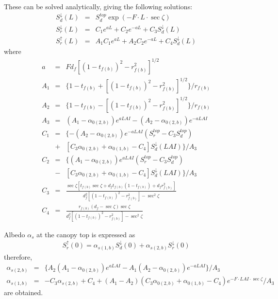 These can be solved analytically, giving the following solutions: \begin{eqnarray}
 S^{\downarrow}_d(L) &=& S^{top}_d \exp(-F\cdot L\cdot \sec\zeta) \\
 S^{\downarrow}_r(L) &=& C_1 e^{a L} + C_2 e^{-a L} + C_3 S^{\downarrow}_d(L) \\
 S^{\uparrow}_r(L)   &=& A_1 C_1 e^{a L} + A_2 C_2 e^{-a L} + C_4 S^{\downarrow}_d(L)
\end{eqnarray} where \begin{eqnarray}
   a &=& F d_f [(1-t_{f(b)})^2 - r_{f(b)}^2]^{1/2}  \\
 A_1 &=& \{ 1 - t_{f(b)} + [(1-t_{f(b)})^2 - r_{f(b)}^2]^{1/2}\} / r_{f(b)} \label{eq17} \\
 A_2 &=& \{ 1 - t_{f(b)} - [(1-t_{f(b)})^2 - r_{f(b)}^2]^{1/2}\} / r_{f(b)} \\
 A_3 &=& (A_1 - \alpha_{0(2,b)}) e^{ a LAI }
        -(A_2 - \alpha_{0(2,b)}) e^{-a LAI } \\
 C_1 &=& \{ -(A_2 - \alpha_{0(2,b)}) e^{-a LAI} (S^{top}_r - C_3 S^{top}_d) \nonumber\\
          &+&   [C_3\alpha_{0(2,b)}+\alpha_{0(1,b)}-C_4]S^{\downarrow}_d(LAI)\} / A_3 \\
 C_2 &=& \{  (A_1 - \alpha_{0(2,b)}) e^{ a LAI} (S^{top}_r - C_3 S^{top}_d) \nonumber\\
          &-&   [C_3\alpha_{0(2,b)}+\alpha_{0(1,b)}-C_4]S^{\downarrow}_d(LAI)\} / A_3 \\
 C_3 &=& \frac{\sec\zeta[t_{f(b)}\sec\zeta + d_f t_{f(b)}(1-t_{f(b)}) + d_f r_{f(b)}^2]}
              {d_f^2[(1-t_{f(b)})^2-r_{f(b)}^2]-\sec^2\zeta} \\
 C_4 &=& \frac{r_{f(b)}(d_f - \sec\zeta)\sec\zeta}
              {d_f^2[(1-t_{f(b)})^2-r_{f(b)}^2]-\sec^2\zeta}
\end{eqnarray}

Albedo \(\alpha_s\) at the canopy top is expressed as \begin{eqnarray}
 S^{\uparrow}_r(0) = \alpha_{s(1,b)} S^{\downarrow}_d(0)
                   + \alpha_{s(2,b)} S^{\downarrow}_r(0)
\end{eqnarray} therefore, \begin{eqnarray}
 \alpha_{s(2,b)} &=& \{ A_2 ( A_1 - \alpha_{0(2,b)}) e^{ a LAI }
                      - A_1 ( A_2 - \alpha_{0(2,b)}) e^{-a LAI }
                   \} / A_3 \\
 \alpha_{s(1,b)} &=& - C_3 \alpha_{s(2,b)} + C_4
                  + ( A_1 - A_2 ) ( C_3 \alpha_{0(2,b)} + \alpha_{0(1,b)} -C_4)
                  e^{- F\cdot LAI\cdot \sec\zeta} / A_3
\end{eqnarray} are obtained.


